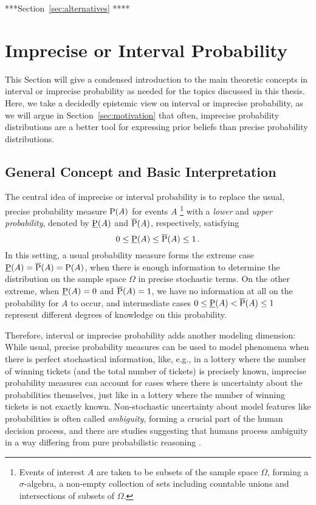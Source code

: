 ***Section~\ref{sec:alternatives} ****


\section{Imprecise or Interval Probability}
\label{sec:ip-intro}

This Section will give a condensed introduction to the main theoretic concepts
in interval or imprecise probability as needed for the topics discussed in this thesis.
Here, we take a decidedly epistemic view on interval or imprecise probability,
as we will argue in Section~\ref{sec:motivation} that often,
imprecise probability distributions are a better tool for expressing prior beliefs
than precise probability distributions.



\subsection{General Concept and Basic Interpretation}
\label{sec:ip-general}

The central idea of imprecise or interval probability \parencite{1991:walley, 2001:weichselberger, 2011:IESS-ip} is
to replace the usual, precise probability measure $\operatorname{P}(A)$ for events $A$%
\footnote{Events of interest $A$ are taken to be subsets of the sample space $\Omega$,
forming a $\sigma$-algebra, a non-empty collection of sets including countable unions and intersections of subsets of $\Omega$.}
with a \emph{lower} and \emph{upper probability}, denoted by $\underline{\operatorname{P}}(A)$ and $\overline{\operatorname{P}}(A)$, respectively,
satisfying
\begin{equation}
\label{eq:0ip1}
0 \le \underline{\operatorname{P}}(A) \le \overline{\operatorname{P}}(A) \le 1\,.
\end{equation}
In this setting, a usual probability measure forms the extreme case $\underline{\operatorname{P}}(A) = \overline{\operatorname{P}}(A) = \operatorname{P}(A)$,
when there is enough information to determine the distribution on the sample space $\Omega$
in precise stochastic terms.
On the other extreme, when $\underline{\operatorname{P}}(A) = 0$ and $\overline{\operatorname{P}}(A) = 1$,
we have no information at all on the probability for $A$ to occur,
and intermediate cases $0 \le \underline{\operatorname{P}}(A) < \overline{\operatorname{P}}(A) \le 1$ represent
different degrees of knowledge on this probability.

Therefore, interval or imprecise probability adds another modeling dimension:
While usual, precise probability measures can be used to model phenomena when there is perfect stochastical information,
like, e.g., in a lottery where the number of winning tickets (and the total number of tickets) is precisely known,
imprecise probability measures can account for cases where there is uncertainty about the probabilities themselves,
just like in a lottery where the number of winning tickets is not exactly known.
Non-stochastic uncertainty about model features like probabilities is often called \emph{ambiguity},
forming a crucial part of the human decision process,
and there are studies suggesting that humans process ambiguity in a way
differing from pure probabilistic reasoning \parencite{2005:hsu-bhatt}.

